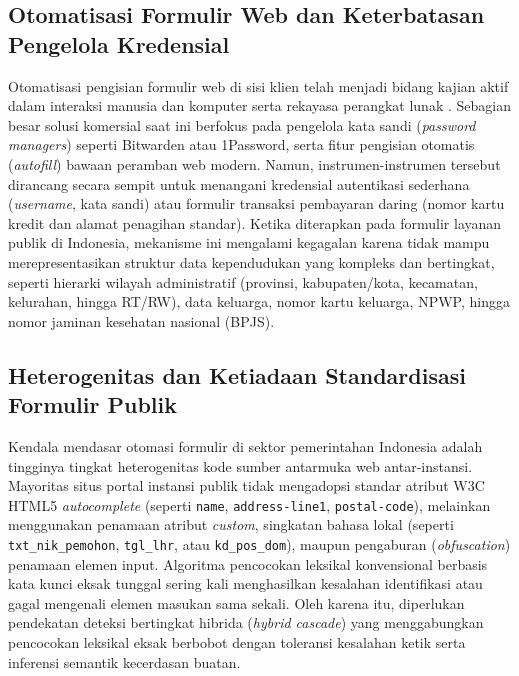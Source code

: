 \documentclass[conference]{IEEEtran}
\begin{document}
\subsection{Otomatisasi Formulir Web dan Keterbatasan Pengelola Kredensial}
Otomatisasi pengisian formulir web di sisi klien telah menjadi bidang kajian aktif dalam interaksi manusia dan komputer serta rekayasa perangkat lunak \cite{Alqahtani2021}. Sebagian besar solusi komersial saat ini berfokus pada pengelola kata sandi (\textit{password managers}) seperti Bitwarden atau 1Password, serta fitur pengisian otomatis (\textit{autofill}) bawaan peramban web modern. Namun, instrumen-instrumen tersebut dirancang secara sempit untuk menangani kredensial autentikasi sederhana (\textit{username}, kata sandi) atau formulir transaksi pembayaran daring (nomor kartu kredit dan alamat penagihan standar). Ketika diterapkan pada formulir layanan publik di Indonesia, mekanisme ini mengalami kegagalan karena tidak mampu merepresentasikan struktur data kependudukan yang kompleks dan bertingkat, seperti hierarki wilayah administratif (provinsi, kabupaten/kota, kecamatan, kelurahan, hingga RT/RW), data keluarga, nomor kartu keluarga, NPWP, hingga nomor jaminan kesehatan nasional (BPJS).

\subsection{Heterogenitas dan Ketiadaan Standardisasi Formulir Publik}
Kendala mendasar otomasi formulir di sektor pemerintahan Indonesia adalah tingginya tingkat heterogenitas kode sumber antarmuka web antar-instansi. Mayoritas situs portal instansi publik tidak mengadopsi standar atribut W3C HTML5 \textit{autocomplete} (seperti \texttt{name}, \texttt{address-line1}, \texttt{postal-code}), melainkan menggunakan penamaan atribut \textit{custom}, singkatan bahasa lokal (seperti \texttt{txt\_nik\_pemohon}, \texttt{tgl\_lhr}, atau \texttt{kd\_pos\_dom}), maupun pengaburan (\textit{obfuscation}) penamaan elemen input. Algoritma pencocokan leksikal konvensional berbasis kata kunci eksak tunggal sering kali menghasilkan kesalahan identifikasi atau gagal mengenali elemen masukan sama sekali. Oleh karena itu, diperlukan pendekatan deteksi bertingkat hibrida (\textit{hybrid cascade}) yang menggabungkan pencocokan leksikal eksak berbobot dengan toleransi kesalahan ketik serta inferensi semantik kecerdasan buatan.
\end{document}
